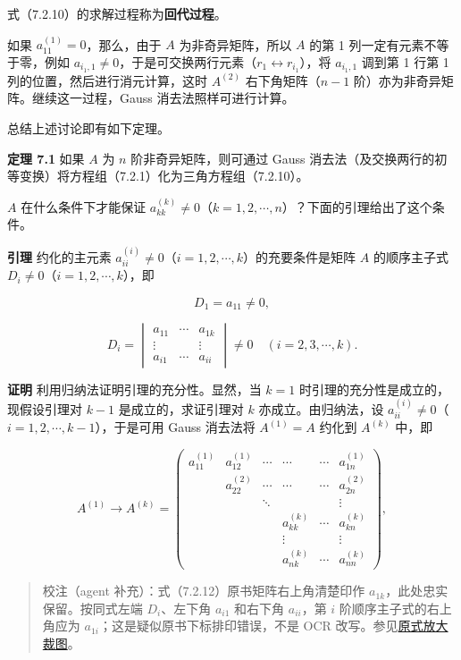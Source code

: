 \documentclass[
  10pt,
  fontset=fandol]{ctexart}
\begin{document}
式（7.2.10）的求解过程称为\textbf{回代过程}。

如果 \(a_{11}^{(1)}=0\)，那么，由于 \(A\) 为非奇异矩阵，所以 \(A\) 的第 1 列一定有元素不等于零，例如 \(a_{i_1,1}\ne0\)，于是可交换两行元素（\(r_1\leftrightarrow r_{i_1}\)），将 \(a_{i_1,1}\) 调到第 1 行第 1 列的位置，然后进行消元计算，这时 \(A^{(2)}\) 右下角矩阵（\(n-1\) 阶）亦为非奇异矩阵。继续这一过程，Gauss 消去法照样可进行计算。

总结上述讨论即有如下定理。

\textbf{定理 7.1} 如果 \(A\) 为 \(n\) 阶非奇异矩阵，则可通过 Gauss 消去法（及交换两行的初等变换）将方程组（7.2.1）化为三角方程组（7.2.10）。

\(A\) 在什么条件下才能保证 \(a_{kk}^{(k)}\ne0\)（\(k=1,2,\cdots,n\)）？下面的引理给出了这个条件。

\textbf{引理} 约化的主元素 \(a_{ii}^{(i)}\ne0\)（\(i=1,2,\cdots,k\)）的充要条件是矩阵 \(A\) 的顺序主子式 \(D_i\ne0\)（\(i=1,2,\cdots,k\)），即

\[D_1=a_{11}\ne0,\]

\[
D_i=\begin{vmatrix}
a_{11}&\cdots&a_{1k}\\
\vdots&&\vdots\\
a_{i1}&\cdots&a_{ii}
\end{vmatrix}\ne0\quad(i=2,3,\cdots,k).
\tag{7.2.12}
\]

\textbf{证明} 利用归纳法证明引理的充分性。显然，当 \(k=1\) 时引理的充分性是成立的，现假设引理对 \(k-1\) 是成立的，求证引理对 \(k\) 亦成立。由归纳法，设 \(a_{ii}^{(i)}\ne0\)（\(i=1,2,\cdots,k-1\)），于是可用 Gauss 消去法将 \(A^{(1)}=A\) 约化到 \(A^{(k)}\) 中，即

\[
A^{(1)}\to A^{(k)}=\begin{pmatrix}
a_{11}^{(1)}&a_{12}^{(1)}&\cdots&\cdots&\cdots&a_{1n}^{(1)}\\
&a_{22}^{(2)}&\cdots&\cdots&\cdots&a_{2n}^{(2)}\\
&&\ddots&&&\vdots\\
&&&a_{kk}^{(k)}&\cdots&a_{kn}^{(k)}\\
&&&\vdots&&\vdots\\
&&&a_{nk}^{(k)}&\cdots&a_{nn}^{(k)}
\end{pmatrix},
\]

\begin{quote}
校注（agent 补充）：式（7.2.12）原书矩阵右上角清楚印作 \(a_{1k}\)，此处忠实保留。按同式左端 \(D_i\)、左下角 \(a_{i1}\) 和右下角 \(a_{ii}\)，第 \(i\) 阶顺序主子式的右上角应为 \(a_{1i}\)；这是疑似原书下标排印错误，不是 OCR 改写。参见\href{/Users/xiangjunfeng/Desktop/数值计算专用/numerical-analysis/book/staging/ch07a/assets/pdf-180-principal-minor-detail.png}{原式放大裁图}。
\end{quote}
\end{document}

